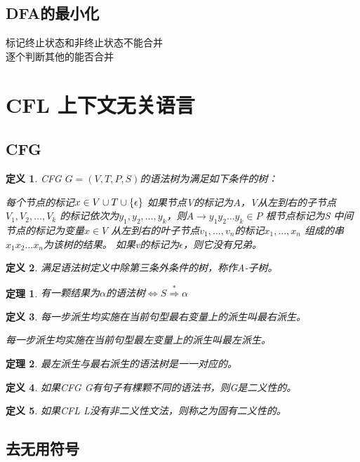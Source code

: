\documentclass[twocolumn,zihao=5,linespread=1,heading=false,autoindent=0pt]{ctexart}
\DeclarePairedDelimiter{\set}{\{}{\}}
\theoremstyle{exampstyle} \newtheorem{definition}{定义}[section]
\theoremstyle{exampstyle} \newtheorem{example}{例}[section]
\theoremstyle{exampstyle} \newtheorem{theorem}{定理}[section]
\theoremstyle{exampstyle} \newtheorem{lemma}{引理}[section]
\theoremstyle{exampstyle} \newtheorem{myproof}{证明}[section]
\begin{document}
\subsection{DFA的最小化}
标记终止状态和非终止状态不能合并 \\
逐个判断其他的能否合并

\section{CFL 上下文无关语言}
\subsection{CFG}
\begin{definition}
    CFG $G=(V, T, P, S)$的语法树为满足如下条件的树：

    \begin{outline}[cenumerate]
        \1 每个节点的标记$x \in V \cup T \cup \set{\epsilon}$
        \1 如果节点V的标记为$A$，V从左到右的子节点$V_1,V_2,\dots,V_k$
        的标记依次为$y_1,y_2,\dots,y_k$，则$A \to y_1y_2\dots y_k \in P$
        \1 根节点标记为S
        \1 中间节点的标记为变量$x \in V$
        \1 从左到右的叶子节点$v_1,\dots,v_n$的标记$x_1,\dots,x_n$
        组成的串$x_1x_2\dots x_n$为该树的结果。
        \1 如果v的标记为$\epsilon$，则它没有兄弟。
    \end{outline}
\end{definition}
\begin{definition}
    满足语法树定义中除第三条外条件的树，称作A-子树。
\end{definition}
\begin{theorem}
    有一颗结果为$\alpha$的语法树$\iff S \overset{*} \Rightarrow \alpha $
\end{theorem}
\begin{definition}
    每一步派生均实施在当前句型最右变量上的派生叫最右派生。

    每一步派生均实施在当前句型最左变量上的派生叫最左派生。
\end{definition}
\begin{theorem}
    最左派生与最右派生的语法树是一一对应的。
\end{theorem}
\begin{definition}
    如果CFG G有句子有棵颗不同的语法书，则G是二义性的。
\end{definition}
\begin{definition}
    如果CFL L没有非二义性文法，则称之为固有二义性的。
\end{definition}
\subsection{去无用符号}
\end{document}
